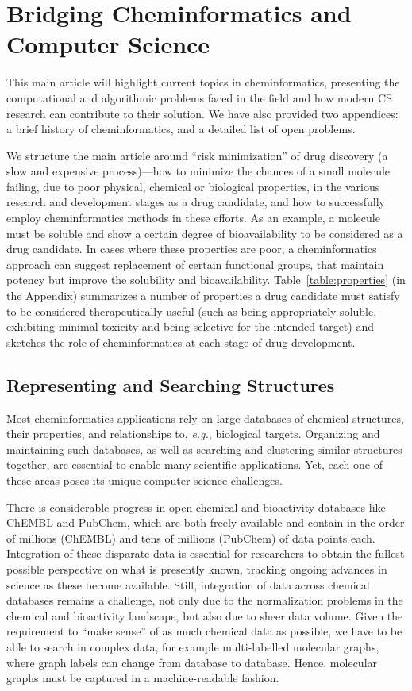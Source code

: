 \documentclass{sig-alternate}
\begin{document}
\section{Bridging Cheminformatics and Computer Science}

This main article will highlight current topics in
cheminformatics, presenting the computational and algorithmic problems
faced in the field and how modern CS research can contribute to their
solution.  We have also provided two appendices: a brief history of cheminformatics, and a detailed list of open problems.

We structure the main article around ``risk minimization'' of drug
discovery (a slow and expensive process)---how to minimize the chances
of a small molecule failing, due to poor physical, chemical or
biological properties, in the various research and development stages
as a drug candidate, and how to successfully employ cheminformatics
methods in these efforts. As an example, a molecule must be soluble
and show a certain degree of bioavailability to be considered as a
drug candidate. In cases where these properties are poor, a
cheminformatics approach can suggest replacement of certain functional
groups, that maintain potency but improve the solubility and
bioavailability.  Table~\ref{table:properties} (in the Appendix)
summarizes a number of properties a drug candidate must satisfy to be
considered therapeutically useful (such as being appropriately
soluble, exhibiting minimal toxicity and being selective for the
intended target) and sketches the role of cheminformatics at each
stage of drug development.
%
\subsection{Representing and Searching Structures}
\label{sec:databases}
%
Most cheminformatics applications rely on large databases of chemical
structures, their properties, and relationships to, \textit{e.g.},
biological targets.  Organizing and maintaining such databases, as
well as searching and clustering similar structures together, are
essential to enable many scientific applications. Yet, each one of
these areas poses its unique computer science challenges.

There is considerable progress in open chemical and bioactivity
databases like ChEMBL and PubChem, which are both freely
available and contain in the order of millions (ChEMBL) and tens of
millions (PubChem) of data points each. Integration of these disparate
data is essential for researchers to obtain the fullest possible
perspective on what is presently known, tracking ongoing advances in
science as these become available. Still, integration of data
across chemical databases remains a challenge, not only due
to the normalization problems in the chemical and bioactivity
landscape, but also due to sheer data volume.
Given the requirement to ``make sense'' of as much chemical data
as possible, we have to be able to search in complex data, for
example multi-labelled molecular graphs, where graph labels can change
from database to database. Hence, molecular graphs must be captured
in a machine-readable fashion.
\end{document}
